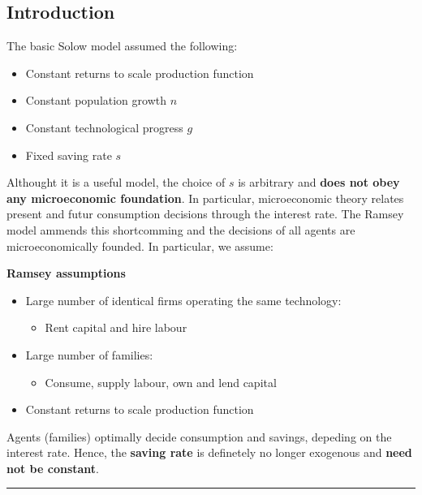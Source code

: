 \documentclass[11pt,a4paper,english]{article}
\providecommand{\tightlist}{%
  \setlength{\itemsep}{0pt}\setlength{\parskip}{0pt}}
\begin{document}
\hypertarget{introduction}{%
\subsection{Introduction}\label{introduction}}

The basic Solow model assumed the following:

\begin{itemize}
\tightlist
\item
  Constant returns to scale production function
\item
  Constant population growth \(n\)
\item
  Constant technological progress \(g\)
\item
  Fixed saving rate \(s\)
\end{itemize}

Althought it is a useful model, the choice of \(s\) is arbitrary and
\textbf{does not obey any microeconomic foundation}. In particular,
microeconomic theory relates present and futur consumption decisions
through the interest rate. The Ramsey model ammends this shortcomming
and the decisions of all agents are microeconomically founded. In
particular, we assume:

\textbf{Ramsey assumptions}

\begin{itemize}
\tightlist
\item
  Large number of identical firms operating the same technology:

  \begin{itemize}
  \tightlist
  \item
    Rent capital and hire labour
  \end{itemize}
\item
  Large number of families:

  \begin{itemize}
  \tightlist
  \item
    Consume, supply labour, own and lend capital
  \end{itemize}
\item
  Constant returns to scale production function
\end{itemize}

Agents (families) optimally decide consumption and savings, depeding on
the interest rate. Hence, the \textbf{saving rate} is definetely no
longer exogenous and \textbf{need not be constant}.

\begin{center}\rule{0.5\linewidth}{\linethickness}\end{center}
\end{document}
